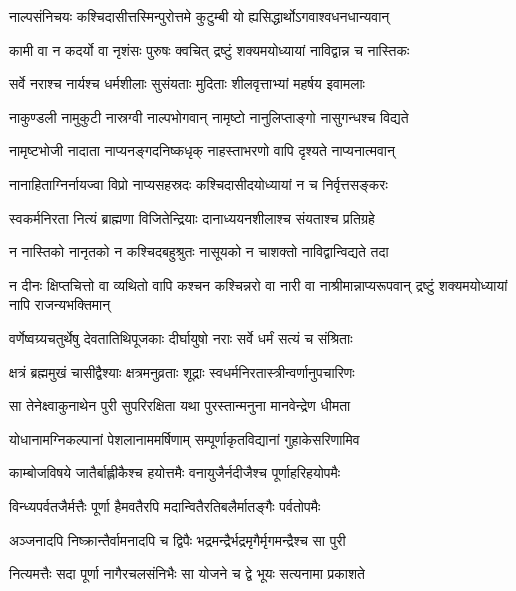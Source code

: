 \twolineshloka
{नाल्पसंनिचयः कश्चिदासीत्तस्मिन्पुरोत्तमे}
{कुटुम्बी यो ह्यसिद्धार्थोऽगवाश्वधनधान्यवान्} %

\twolineshloka
{कामी वा न कदर्यो वा नृशंसः पुरुषः क्वचित्}
{द्रष्टुं शक्यमयोध्यायां नाविद्वान्न च नास्तिकः} %

\twolineshloka
{सर्वे नराश्च नार्यश्च धर्मशीलाः सुसंयताः}
{मुदिताः शीलवृत्ताभ्यां महर्षय इवामलाः} %

\twolineshloka
{नाकुण्डली नामुकुटी नास्रग्वी नाल्पभोगवान्}
{नामृष्टो नानुलिप्ताङ्गो नासुगन्धश्च विद्यते} %

\twolineshloka
{नामृष्टभोजी नादाता नाप्यनङ्गदनिष्कधृक्}
{नाहस्ताभरणो वापि दृश्यते नाप्यनात्मवान्} %

\twolineshloka
{नानाहिताग्निर्नायज्वा विप्रो नाप्यसहस्रदः}
{कश्चिदासीदयोध्यायां न च निर्वृत्तसङ्करः} %

\twolineshloka
{स्वकर्मनिरता नित्यं ब्राह्मणा विजितेन्द्रियाः}
{दानाध्ययनशीलाश्च संयताश्च प्रतिग्रहे} %

\twolineshloka
{न नास्तिको नानृतको न कश्चिदबहुश्रुतः}
{नासूयको न चाशक्तो नाविद्वान्विद्यते तदा} %

\threelineshloka
{न दीनः क्षिप्तचित्तो वा व्यथितो वापि कश्चन}
{कश्चिन्नरो वा नारी वा नाश्रीमान्नाप्यरूपवान्}
{द्रष्टुं शक्यमयोध्यायां नापि राजन्यभक्तिमान्} %

\twolineshloka
{वर्णेष्वग्र्यचतुर्थेषु देवतातिथिपूजकाः}
{दीर्घायुषो नराः सर्वे धर्मं सत्यं च संश्रिताः} %

\twolineshloka
{क्षत्रं ब्रह्ममुखं चासीद्वैश्याः क्षत्रमनुव्रताः}
{शूद्राः स्वधर्मनिरतास्त्रीन्वर्णानुपचारिणः} %

\twolineshloka
{सा तेनेक्ष्वाकुनाथेन पुरी सुपरिरक्षिता}
{यथा पुरस्तान्मनुना मानवेन्द्रेण धीमता} %

\twolineshloka
{योधानामग्निकल्पानां पेशलानाममर्षिणाम्}
{सम्पूर्णाकृतविद्यानां गुहाकेसरिणामिव} %

\twolineshloka
{काम्बोजविषये जातैर्बाह्लीकैश्च हयोत्तमैः}
{वनायुजैर्नदीजैश्च पूर्णाहरिहयोपमैः} %

\twolineshloka
{विन्ध्यपर्वतजैर्मत्तैः पूर्णा हैमवतैरपि}
{मदान्वितैरतिबलैर्मातङ्गैः पर्वतोपमैः} %

\twolineshloka
{अञ्जनादपि निष्क्रान्तैर्वामनादपि च द्विपैः}
{भद्रमन्द्रैर्भद्रमृगैर्मृगमन्द्रैश्च सा पुरी} %

\twolineshloka
{नित्यमत्तैः सदा पूर्णा नागैरचलसंनिभैः}
{सा योजने च द्वे भूयः सत्यनामा प्रकाशते} %

